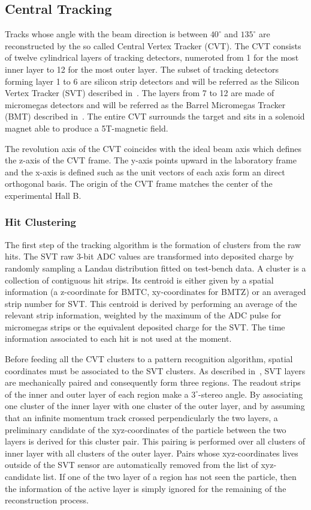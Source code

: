 \documentclass[3p,times,twocolumn]{elsarticle}
\begin{document}
\subsection{Central Tracking}

Tracks whose angle with the beam direction is between $40^\circ$ and $135^\circ$ are reconstructed by the so called
Central Vertex Tracker (CVT). The CVT consists of twelve cylindrical layers of tracking detectors, numeroted from 1 for
the most inner layer to 12 for the most outer layer. The subset of tracking detectors forming layer 1 to 6 are silicon
strip detectors and will be referred as the Silicon Vertex Tracker (SVT) described in~\cite{svt-nim}. The layers from 7
to 12 are made of micromegas detectors and will be referred as the Barrel Micromegas Tracker (BMT) described
in~\cite{mm-nim}. The entire CVT surrounds the target and sits in a solenoid magnet able to produce a 5T-magnetic
field.

The revolution axis of the CVT coincides with the ideal beam axis which defines the z-axis of the CVT frame. The y-axis
points upward in the laboratory frame and the x-axis is defined such as the unit vectors of each axis form an direct
orthogonal basis. The origin of the CVT frame matches the center of the experimental Hall B.

\subsubsection{Hit Clustering}
The first step of the tracking algorithm is the formation of clusters from the raw hits. The SVT raw 3-bit ADC values
are transformed into deposited charge by randomly sampling a Landau distribution fitted on test-bench data. A cluster
is a collection of contiguous hit strips. Its centroid is either given by a spatial information (a z-coordinate for
BMTC, xy-coordinates for BMTZ) or an averaged strip number for SVT. This centroid is derived by performing an average of
the relevant strip information, weighted by the maximum of the ADC pulse for micromegas strips or the equivalent
deposited charge for the SVT.
The time information associated to each hit is not used at the moment.

Before feeding all the CVT clusters to a pattern recognition algorithm, spatial coordinates must be associated to the
SVT clusters. As described in~\cite{svt-nim}, SVT layers are mechanically paired and consequently form three regions.
The readout strips of the inner and outer layer of each region make a $3^\circ$-stereo angle. By associating one
cluster of the inner layer with one cluster of the outer layer, and by assuming that an infinite momentum track crossed
perpendicularly the two layers, a preliminary candidate of the xyz-coordinates of the particle between the two layers
is derived for this cluster pair. This pairing is performed over all clusters of inner layer with all clusters of the
outer layer. Pairs whose xyz-coordinates lives outside of the SVT sensor are automatically removed from the list of
xyz-candidate list. If one of the two layer of a region has not seen the particle, then the information of the active
layer is simply ignored for the remaining of the reconstruction process.
\end{document}
